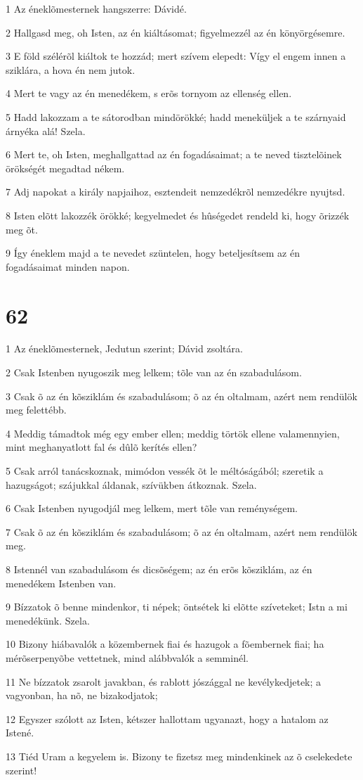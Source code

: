 \par 1 Az éneklõmesternek hangszerre: Dávidé.
\par 2 Hallgasd meg, oh Isten, az én kiáltásomat; figyelmezzél az én könyörgésemre.
\par 3 E föld szélérõl kiáltok te hozzád; mert szívem elepedt: Vígy el engem innen a sziklára, a hova én nem jutok.
\par 4 Mert te vagy az én menedékem, s erõs tornyom az ellenség ellen.
\par 5 Hadd lakozzam a te sátorodban mindörökké; hadd meneküljek a te szárnyaid árnyéka alá! Szela.
\par 6 Mert te, oh Isten, meghallgattad az én fogadásaimat; a te neved tisztelõinek örökségét megadtad nékem.
\par 7 Adj napokat a király napjaihoz, esztendeit nemzedékrõl nemzedékre nyujtsd.
\par 8 Isten elõtt lakozzék örökké; kegyelmedet és hûségedet rendeld ki, hogy õrizzék meg õt.
\par 9 Így éneklem majd a te nevedet szüntelen, hogy beteljesítsem az én fogadásaimat minden napon.

\chapter{62}

\par 1 Az éneklõmesternek, Jedutun szerint; Dávid zsoltára.
\par 2 Csak Istenben nyugoszik meg lelkem; tõle van az én szabadulásom.
\par 3 Csak õ az én kõsziklám és szabadulásom; õ az én oltalmam, azért nem rendülök meg felettébb.
\par 4 Meddig támadtok még egy ember ellen; meddig törtök ellene valamennyien, mint meghanyatlott fal és dûlõ kerítés ellen?
\par 5 Csak arról tanácskoznak, mimódon vessék õt le méltóságából; szeretik a hazugságot; szájukkal áldanak, szívükben átkoznak. Szela.
\par 6 Csak Istenben nyugodjál meg lelkem, mert tõle van reménységem.
\par 7 Csak õ az én kõsziklám és szabadulásom; õ az én oltalmam, azért nem rendülök meg.
\par 8 Istennél van szabadulásom és dicsõségem; az én erõs kõsziklám, az én menedékem Istenben van.
\par 9 Bízzatok õ benne mindenkor, ti népek; öntsétek ki elõtte szíveteket; Istn a mi menedékünk. Szela.
\par 10 Bizony hiábavalók a közembernek fiai és hazugok a fõembernek fiai; ha mérõserpenyõbe vettetnek, mind alábbvalók a semminél.
\par 11 Ne bízzatok zsarolt javakban, és rablott jószággal ne kevélykedjetek; a vagyonban, ha nõ, ne bizakodjatok;
\par 12 Egyszer szólott az Isten, kétszer hallottam ugyanazt, hogy a hatalom az Istené.
\par 13 Tiéd Uram a kegyelem is. Bizony te fizetsz meg mindenkinek az õ cselekedete szerint!

